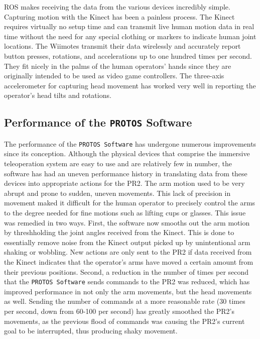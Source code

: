 \documentclass{sig-alternate}
\begin{document}
\indent  ROS makes receiving the data from the various devices incredibly simple. Capturing motion with the Kinect has been a painless process. 
The Kinect requires virtually no setup time and can transmit live human motion data in real time without the 
need for any special clothing or markers to indicate human joint locations.
The Wiimotes transmit their data wirelessly and accurately report button presses, rotations, and accelerations up to one hundred times per second. They fit 
nicely in the palms of the human operators' hands since they are originally intended to be used as video game controllers. The three-axis accelerometer for capturing head 
movement has worked very well in reporting the operator's head tilts and rotations.

\subsection {Performance of the {\tt PROTOS} Software}
\indent The performance of the {\tt PROTOS Software} has undergone numerous improvements since its conception. 
Although the physical devices that comprise the immersive teleoperation system 
are easy to use and are relatively few in number, the software has had an uneven performance history in translating data from these devices 
into appropriate actions for the PR2. The arm motion used to be very abrupt and prone to sudden, uneven movements. This lack of 
precision in movement maked it difficult for the human operator to precisely control the arms to the degree needed for fine motions such as lifting cups or glasses. This
issue was remedied in two ways. First, the software now smooths out the arm motion by threshholding the joint angles received from the Kinect.
This is done to essentially remove noise from the Kinect output picked up by unintentional arm shaking or wobbling. New actions are only sent to the PR2 if data received 
from the Kinect indicates that the operator's arms have moved a certain amount from their previous positions. Second, a reduction in the number of times per second that the
{\tt PROTOS Software} sends commands to the PR2 was reduced, which has improved performance in not only the arm movements, but the head movements as well. Sending the 
number of commands at a more reasonable rate (30 times per second, down from 60-100 per second) has greatly smoothed the PR2's movements, as the previous flood of commands
was causing the PR2's current goal to be interrupted, thus producing shaky movement.
\end{document}
